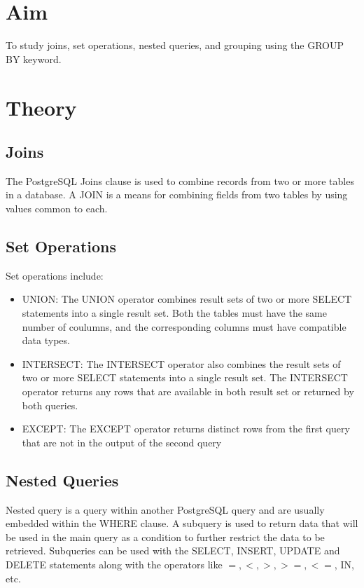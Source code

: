 \section{Aim}
 To study joins, set operations, nested queries, and grouping using the GROUP BY keyword.

\section{{Theory}}

\subsection{Joins}

The PostgreSQL Joins clause is used to combine records from two or more tables in a database. A JOIN is a means for combining fields from two tables by using values common to each.

\subsection{Set Operations}

Set operations include:
\begin{itemize}
	\item UNION: The UNION operator combines result sets of two or more SELECT statements into a single result set. Both the tables must have the same number of coulumns, and the corresponding columns must have compatible data types.
	\item INTERSECT: The INTERSECT operator also combines the result sets of two or more SELECT statements into a single result set. The INTERSECT operator returns any rows that are available in both result set or returned by both queries.
	\item EXCEPT: The EXCEPT operator returns distinct rows from the first query that are not in the output of the second query
\end{itemize}

\subsection{Nested Queries}

Nested query is a query within another PostgreSQL query and are usually embedded within the WHERE clause.\newline
A subquery is used to return data that will be used in the main query as a condition to further restrict the data to be retrieved.\newline
Subqueries can be used with the SELECT, INSERT, UPDATE and DELETE statements along with the operators like $=, <, >, >=, <=$, IN, etc.


